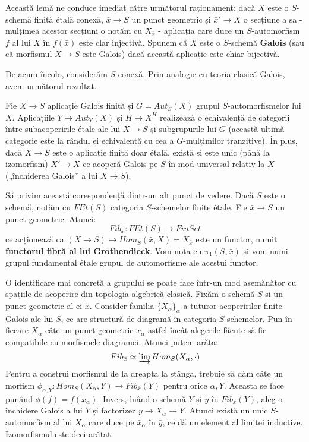 \documentclass[13pt,openany]{book}
\begin{document}
Această lemă ne conduce imediat către următorul raționament: dacă $X$ este o $S$-schemă finită étală conexă, $\bar{x} \rightarrow S$ un punct geometric și $\bar{x}'\rightarrow X$ o secțiune a sa - mulțimea acestor secțiuni o notăm cu $X_{\bar{x}}$ - aplicația care duce un $S$-automorfism $f$ al lui $X$ în $f(\bar{x})$ este clar injectivă. Spunem că $X$ este o $S$-schemă {\bf Galois} (sau că morfismul $X \rightarrow S$ este Galois) dacă această aplicație este chiar bijectivă.

De acum încolo, considerăm $S$ conexă. Prin analogie cu teoria clasică Galois, avem următorul rezultat.

\begin{prop}
Fie $X \rightarrow S$ aplicație Galois finită și $G=Aut_S(X)$ grupul $S$-automorfismelor lui $X$. Aplicațiile $Y \mapsto Aut_Y(X)$ și $H \mapsto X^H$ realizează o echivalență de categorii între subacoperirile étale ale lui $X \rightarrow S$ și subgrupurile lui $G$ (această ultimă categorie este la rândul ei echivalentă cu cea a $G$-mulțimilor tranzitive). În plus, dacă $X \rightarrow S$ este o aplicație finită doar étală, există și este unic (până la izomorfism) $X' \rightarrow X$ ce acoperă Galois pe $S$ în mod universal relativ la $X$ („închiderea Galois” a lui $X \rightarrow S$).
\end{prop}

Să privim această corespondență dintr-un alt punct de vedere. Dacă $S$ este o schemă, notăm cu $FEt(S)$ categoria $S$-schemelor finite étale. Fie $\bar{x} \rightarrow S$ un punct geometric. Atunci:
$$Fib_{\bar{x}} : FEt(S) \rightarrow FinSet$$
ce acționează ca $(X \rightarrow S) \mapsto Hom_S(\bar{x},X)=X_{\bar{x}}$ este un functor, numit {\bf functorul fibră al lui Grothendieck}. Vom nota cu $\pi_1(S,\bar{x})$ și vom numi grupul fundamental étale grupul de automorfisme ale acestui functor.

O identificare mai concretă a grupului se poate face într-un mod asemănător cu spațiile de acoperire din topologia algebrică clasică. Fixăm o schemă $S$ și un punct geometric al ei $\bar{x}$. Consider familia $\{X_\alpha\}_\alpha$ a tuturor acoperirilor finite Galois ale lui $S$, ce are structură de diagramă în categoria $S$-schemelor. Pun în fiecare $X_\alpha$ câte un punct geometric $\bar{x}_\alpha$ astfel încât alegerile făcute să fie compatibile cu morfismele diagramei. Atunci putem arăta:
$$Fib_{\bar{x}} \simeq \varinjlim Hom_S(X_\alpha,\cdot)$$
Pentru a construi morfismul de la dreapta la stânga, trebuie să dăm câte un morfism $\phi_{\alpha,Y} : Hom_S(X_\alpha,Y) \rightarrow Fib_{\bar{x}}(Y)$ pentru orice $\alpha,Y$. Aceasta se face punând $\phi(f)=f(\bar{x}_\alpha)$. Invers, luând o schemă $Y$ și $\bar{y}$ în $Fib_{\bar{x}}(Y)$, aleg o închidere Galois a lui $Y$ și factorizez $\bar{y} \rightarrow X_\alpha \rightarrow Y$. Atunci există un unic $S$-automorfism al lui $X_\alpha$ care duce pe $\bar{x}_\alpha$ în $\bar{y}$, ce dă un element al limitei inductive. Izomorfismul este deci arătat.
\end{document}
